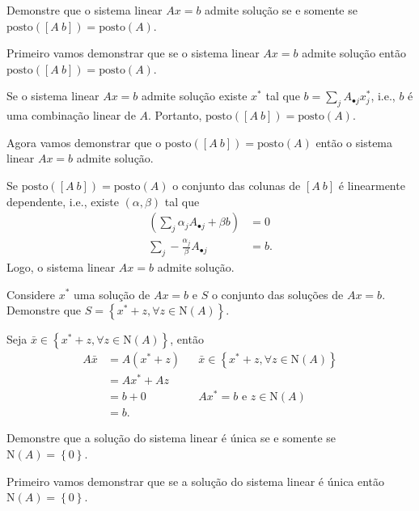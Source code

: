 \documentclass[a4paper,12pt, leqno, answers]{exam}
\newcommand{\mdot}{\bullet}
\newcommand{\EN}{\text{N}}
\newcommand{\posto}{\text{posto}}
\begin{document}
\begin{questions}
    \question Demonstre que o sistema linear $A x = b$ admite solu\c{c}\~{a}o se e somente se $\posto ([A \ b]) = \posto (A)$.
    \begin{solution}
        Primeiro vamos demonstrar que se o sistema linear $A x = b$ admite solu\c{c}\~{a}o ent\~{a}o $\posto ([A \ b]) = \posto (A)$.

        Se o sistema linear $A x = b$ admite solu\c{c}\~{a}o existe $x^*$ tal que $b = \sum_j A_{\mdot j} x^*_j$, i.e., $b$ \'{e} uma combina\c{c}\~{a}o linear de $A$. Portanto, $\posto ([A \ b]) = \posto (A)$.

        Agora vamos demonstrar que o $\posto ([A \ b]) = \posto (A)$ ent\~{a}o o sistema linear $A x = b$ admite solu\c{c}\~{a}o.

        Se $\posto ([A \ b]) = \posto (A)$ o conjunto das colunas de $[A \ b]$ \'{e} linearmente dependente, i.e., existe $(\alpha, \beta)$ tal que
        \begin{align*}
            \left( \sum_j \alpha_j A_{\mdot j} + \beta b \right) &= 0 \\
            \sum_j - \frac{\alpha_j}{\beta} A_{\mdot j} &= b.
        \end{align*}
        Logo, o sistema linear $A x = b$ admite solu\c{c}\~{a}o.
    \end{solution}

    \question Considere $x^*$ uma solu\c{c}\~{a}o de $A x = b$ e $S$ o conjunto das solu\c{c}\~{o}es de $A x = b$. Demonstre que $S = \left\{ x^* + z, \forall z \in \EN (A) \right\}$.
    \begin{solution}
        Seja $\bar{x} \in \left\{ x^* + z, \forall z \in \EN (A) \right\}$, ent\~{a}o
        \begin{align*}
            A \bar{x} &= A \left( x^* + z \right) && \bar{x} \in \left\{ x^* + z, \forall z \in \EN (A) \right\} \\
            &= A x^* + A z \\
            &= b + 0 && A x^* = b \text{ e } z \in \EN (A) \\
            &= b.
        \end{align*}
    \end{solution}

    \question Demonstre que a solu\c{c}\~{a}o do sistema linear \'{e} \'{u}nica se e somente se $\EN (A) = \left\{ 0 \right\}$.
    \begin{solution}
        Primeiro vamos demonstrar que se a solu\c{c}\~{a}o do sistema linear \'{e} \'{u}nica ent\~{a}o $\EN (A) = \left\{ 0 \right\}$.


\end{solution}
\end{questions}
\end{document}
